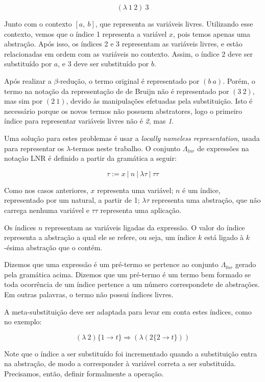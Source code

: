 \[ (\lambda\ 1\ 2)\ 3 \]

Junto com o contexto $[a,\ b]$, que representa as variáveis livres.  Utilizando
esse contexto, vemos que o índice 1 representa a variável $x$, pois temos apenas
uma abstração. Após isso, os índices 2 e 3 representam as variáveis livres, e
estão relacionadas em ordem com as variáveis no contexto.  Assim, o índice $2$
deve ser substituído por $a$, e $3$ deve ser substituído por $b$.

Após realizar a $\beta$-redução, o termo original é representado por $(b\ a)$.
Porém, o termo na notação da representação de de Bruijn não é representado por
$(3\ 2)$, mas sim por $(2\ 1)$, devido às manipulações efetuadas pela
substituição. Isto é necessário porque os novos termos não possuem abstratores,
logo o primeiro índice para representar variáveis livres não é \textit{2}, mas
\textit{1}.

Uma solução para estes problemas é usar a \textit{locally nameless
representation}, usada para representar os $\lambda$-termos neste trabalho.
O conjunto $\Lambda_{lnr}$ de expressões na notação LNR é definido a partir da
gramática a seguir:

\[ \tau := x\ |\ n\ |\ \lambda \tau\ |\ \tau \tau \]

Como nos casos anteriores, $x$ representa uma variável; $n$ é um índice,
representado por um natural, a partir de 1; $\lambda \tau$ representa uma
abstração, que não carrega nenhuma variável e $\tau \tau$ representa uma
aplicação.

Os índices $n$ representam as variáveis ligadas da expressão. O valor do índice
representa a abstração a qual ele se refere, ou seja, um índice $k$ está ligado
à $k$-ésima abstração que o contém.

\begin{definicao}
    Dizemos que uma expressão é um pré-termo se pertence ao conjunto
    $\Lambda_{lnr}$ gerado pela gramática acima.
    Dizemos que um pré-termo é um termo bem formado se toda ocorrência de um
    índice pertence a um número correspondete de abstrações. Em outras palavras,
    o termo não possui índices livres.
\end{definicao}

A meta-substituição deve ser adaptada para levar em conta estes índices, como no
exemplo:

\[ (\lambda\ 2) \{1 \rightarrow t\} \Rightarrow ( \lambda (2 \{2 \rightarrow t\}) ) \]

Note que o índice a ser substituído foi incrementado quando a substituição entra
na abstração, de modo a corresponder à variável correta a ser substituída.
Precisamos, então, definir formalmente a operação.


